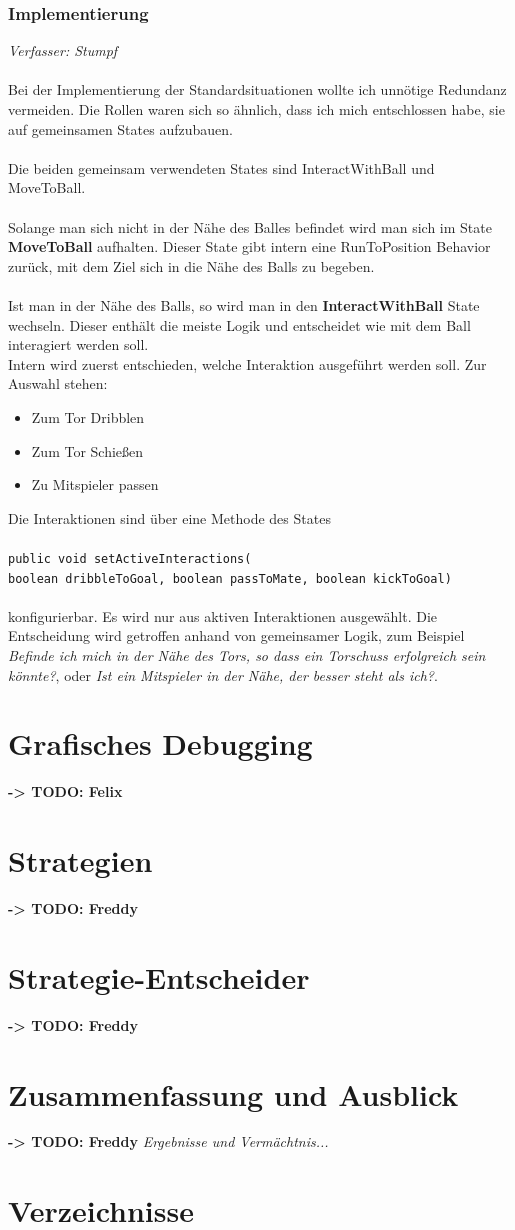\documentclass[fontsize=12pt,a4paper,final]{scrartcl}[2003/01/01]
\begin{document}
\subsubsection{Implementierung}
\textit{Verfasser: Stumpf}\\
\\
Bei der Implementierung der Standardsituationen wollte ich unnötige Redundanz vermeiden. Die Rollen waren sich so ähnlich, dass ich mich entschlossen habe, sie auf gemeinsamen States aufzubauen.\\
\\
Die beiden gemeinsam verwendeten States sind InteractWithBall und MoveToBall.\\
\\
Solange man sich nicht in der Nähe des Balles befindet wird man sich im State \textbf{MoveToBall} aufhalten. Dieser State gibt intern eine RunToPosition Behavior zurück, mit dem Ziel sich in die Nähe des Balls zu begeben.\\
\\
Ist man in der Nähe des Balls, so wird man in den \textbf{InteractWithBall} State wechseln. Dieser enthält die meiste Logik und entscheidet wie mit dem Ball interagiert werden soll.\\ 
Intern wird zuerst entschieden, welche Interaktion ausgeführt werden soll. Zur Auswahl stehen:
\begin{itemize}
\item Zum Tor Dribblen
\item Zum Tor Schießen
\item Zu Mitspieler passen
\end{itemize}
Die Interaktionen sind über eine Methode des States \\
\\
\texttt{public void setActiveInteractions(\\boolean dribbleToGoal, boolean passToMate, boolean kickToGoal)}\\
\\
konfigurierbar. Es wird nur aus aktiven Interaktionen ausgewählt.
Die Entscheidung wird getroffen anhand von gemeinsamer Logik, zum Beispiel \textit{\glqq Befinde ich mich in der Nähe des Tors, so dass ein Torschuss erfolgreich sein könnte?\grqq}, oder \textit{\glqq Ist ein Mitspieler in der Nähe, der besser steht als ich?\grqq}.

\section{Grafisches Debugging}\label{se:Grafisches Debugging}
\textbf{-> TODO: Felix}
\section{Strategien}
\textbf{-> TODO: Freddy}
\section{Strategie-Entscheider}
\textbf{-> TODO: Freddy}
\section{Zusammenfassung und Ausblick}
\textbf{-> TODO: Freddy}
\textit{Ergebnisse und Vermächtnis...}

\section{Verzeichnisse}
\listoffigures

\lstlistoflistings 
\end{document}
